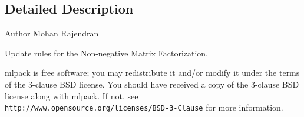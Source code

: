 \subsection{Detailed Description}
\begin{DoxyAuthor}{Author}
Mohan Rajendran
\end{DoxyAuthor}
Update rules for the Non-\/negative Matrix Factorization.

mlpack is free software; you may redistribute it and/or modify it under the terms of the 3-\/clause B\+SD license. You should have received a copy of the 3-\/clause B\+SD license along with mlpack. If not, see {\tt http\+://www.\+opensource.\+org/licenses/\+B\+S\+D-\/3-\/\+Clause} for more information. 